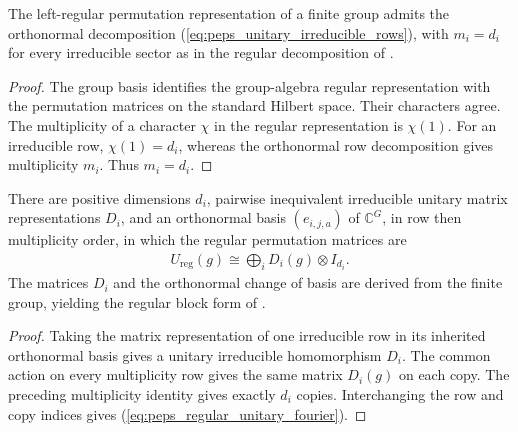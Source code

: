 \begin{lemma}
    \label{thm:peps_regular_fourier_multiplicities}
    \leanok
    The left-regular permutation representation of a finite group
    admits the orthonormal decomposition
    (\ref{eq:peps_unitary_irreducible_rows}), with $m_i=d_i$ for every
    irreducible sector as in the regular decomposition of
    \cite[Section~7]{Schuch2010PEPS}.
\end{lemma}
\begin{proof}\leanok
    The group basis identifies the group-algebra regular representation
    with the permutation matrices on the standard Hilbert space.
    Their characters agree. The multiplicity of a character $\chi$ in
    the regular representation is $\chi(1)$. For an irreducible row,
    $\chi(1)=d_i$, whereas the orthonormal row decomposition gives
    multiplicity $m_i$. Thus $m_i=d_i$.
\end{proof}

\begin{lemma}
    \label{thm:peps_regular_unitary_fourier}
    \leanok
    There are positive dimensions $d_i$, pairwise inequivalent irreducible
    unitary matrix representations $D_i$, and an orthonormal basis
    $(e_{i,j,a})$ of $\mathbb C^G$, in row then multiplicity order, in
    which the regular permutation matrices are
    \begin{align}
        U_{\mathrm{reg}}(g)\cong
        \bigoplus_i D_i(g)\otimes I_{d_i}.
        \label{eq:peps_regular_unitary_fourier}
    \end{align}
    The matrices $D_i$ and the orthonormal change of basis are derived
    from the finite group, yielding the regular block form of
    \cite[Section~7]{Schuch2010PEPS}.
\end{lemma}
\begin{proof}\leanok
    Taking the matrix representation of one irreducible row in its inherited
    orthonormal basis gives a unitary irreducible homomorphism $D_i$.
    The common action on every multiplicity row gives the same matrix
    $D_i(g)$ on each copy. The preceding multiplicity identity gives
    exactly $d_i$ copies. Interchanging the row and copy indices gives
    (\ref{eq:peps_regular_unitary_fourier}).
\end{proof}
